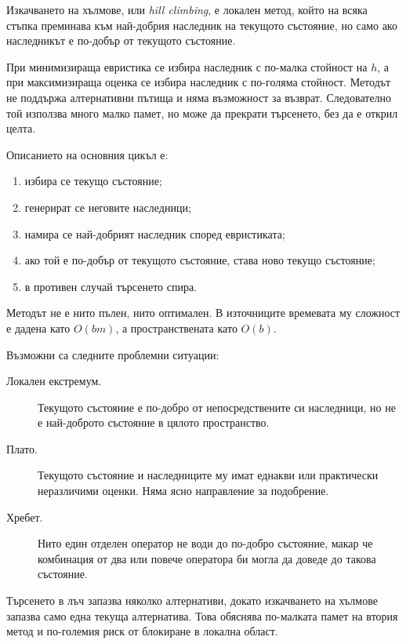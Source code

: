 \begin{defn}
Изкачването на хълмове, или \emph{hill climbing}, е локален метод, който на всяка стъпка преминава към най-добрия наследник на текущото състояние, но само ако наследникът е по-добър от текущото състояние.
\end{defn}

При минимизираща евристика се избира наследник с по-малка стойност на $h$, а при максимизираща оценка се избира наследник с по-голяма стойност. Методът не поддържа алтернативни пътища и няма възможност за възврат. Следователно той използва много малко памет, но може да прекрати търсенето, без да е открил целта.

Описанието на основния цикъл е:

\begin{enumerate}
\item избира се текущо състояние;
\item генерират се неговите наследници;
\item намира се най-добрият наследник според евристиката;
\item ако той е по-добър от текущото състояние, става ново текущо състояние;
\item в противен случай търсенето спира.
\end{enumerate}

Методът не е нито пълен, нито оптимален. В източниците времевата му сложност е дадена като $O(bm)$, а пространствената като $O(b)$.

Възможни са следните проблемни ситуации:

\begin{description}
\item[Локален екстремум.] Текущото състояние е по-добро от непосредствените си наследници, но не е най-доброто състояние в цялото пространство.
\item[Плато.] Текущото състояние и наследниците му имат еднакви или практически неразличими оценки. Няма ясно направление за подобрение.
\item[Хребет.] Нито един отделен оператор не води до по-добро състояние, макар че комбинация от два или повече оператора би могла да доведе до такова състояние.
\end{description}

\begin{remark}
Търсенето в лъч запазва няколко алтернативи, докато изкачването на хълмове запазва само една текуща алтернатива. Това обяснява по-малката памет на втория метод и по-големия риск от блокиране в локална област.
\end{remark}

